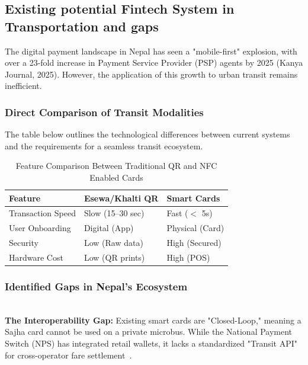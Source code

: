 \documentclass[sigconf, nonacm]{acmart}
\begin{document}
\subsection{Existing potential Fintech System in Transportation and gaps}

The digital payment landscape in Nepal has seen a "mobile-first" explosion, with over a 23-fold increase in Payment Service Provider (PSP) agents by 2025 (Kanya Journal, 2025). However, the application of this growth to urban transit remains inefficient.

\subsubsection{Direct Comparison of Transit Modalities}

The table below outlines the technological differences between current systems and the requirements for a seamless transit ecosystem.


\begin{table}[H]
\centering
\caption{Feature Comparison Between Traditional QR and NFC Enabled Cards}
\begin{tabular}{lll}
\toprule
\textbf{Feature} & \textbf{Esewa/Khalti QR} & \textbf{Smart Cards} \\
\midrule
Transaction Speed & Slow (15--30 sec) & Fast ($<$ 5s) \\
User Onboarding   & Digital (App) & Physical (Card) \\
Security          & Low (Raw data) & High (Secured) \\
Hardware Cost     & Low (QR prints) & High (POS) \\
\bottomrule
\end{tabular}
\end{table}

\subsubsection{Identified Gaps in Nepal's Ecosystem} \mbox{} \\

\textbf{The Interoperability Gap:} Existing smart cards are "Closed-Loop," meaning a Sajha card cannot be used on a private microbus. While the National Payment Switch (NPS) has integrated retail wallets, it lacks a standardized "Transit API" for cross-operator fare settlement~\cite{nrb2024payment}.
\end{document}
